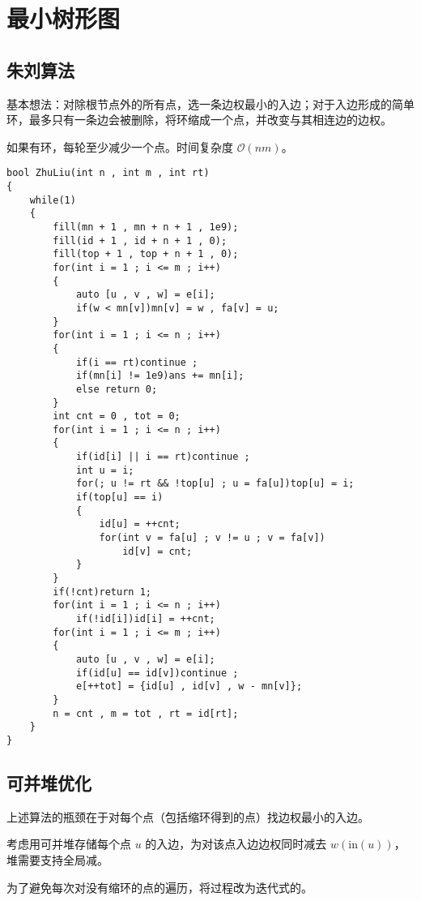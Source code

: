 \section{最小树形图}

\subsection{朱刘算法}

基本想法：对除根节点外的所有点，选一条边权最小的入边；对于入边形成的简单环，最多只有一条边会被删除，将环缩成一个点，并改变与其相连边的边权。

如果有环，每轮至少减少一个点。时间复杂度 $\mathcal{O}(nm)$。

\begin{verbatim}
bool ZhuLiu(int n , int m , int rt)
{
    while(1)
    {
        fill(mn + 1 , mn + n + 1 , 1e9);
        fill(id + 1 , id + n + 1 , 0);
        fill(top + 1 , top + n + 1 , 0);
        for(int i = 1 ; i <= m ; i++)
        {
            auto [u , v , w] = e[i];
            if(w < mn[v])mn[v] = w , fa[v] = u;
        }
        for(int i = 1 ; i <= n ; i++)
        {
            if(i == rt)continue ;
            if(mn[i] != 1e9)ans += mn[i];
            else return 0;
        }
        int cnt = 0 , tot = 0;
        for(int i = 1 ; i <= n ; i++)
        {
            if(id[i] || i == rt)continue ;
            int u = i;
            for(; u != rt && !top[u] ; u = fa[u])top[u] = i;
            if(top[u] == i)
            {
                id[u] = ++cnt;
                for(int v = fa[u] ; v != u ; v = fa[v])
                    id[v] = cnt;
            }
        }
        if(!cnt)return 1;
        for(int i = 1 ; i <= n ; i++)
            if(!id[i])id[i] = ++cnt;
        for(int i = 1 ; i <= m ; i++)
        {
            auto [u , v , w] = e[i];
            if(id[u] == id[v])continue ;
            e[++tot] = {id[u] , id[v] , w - mn[v]};
        }
        n = cnt , m = tot , rt = id[rt];
    }
}
\end{verbatim}

\subsection{可并堆优化}

上述算法的瓶颈在于对每个点（包括缩环得到的点）找边权最小的入边。

考虑用可并堆存储每个点 $u$ 的入边，为对该点入边边权同时减去 $w(\text{in}(u))$，堆需要支持全局减。

为了避免每次对没有缩环的点的遍历，将过程改为迭代式的。

